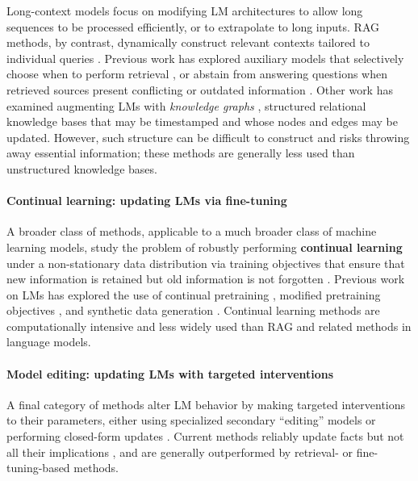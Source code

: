 \documentclass[11pt]{article}
\begin{document}
Long-context models \citep{wang2020linformer,kitaev2020reformer,press2021train,su2024roformer} focus on modifying LM architectures to allow long sequences to be processed efficiently, or to extrapolate to long inputs.
RAG methods, by contrast, dynamically 
construct relevant contexts tailored to individual queries \citep{guu2020,lewis2020}.
Previous work has explored auxiliary models that selectively choose when to perform retrieval \citep{mitchell2022memory}, or abstain from answering questions when retrieved sources present conflicting or outdated information \citep{chen-etal-2022-rich,zhang-choi-2023-mitigating}.
Other work has examined augmenting LMs with \textit{knowledge graphs} \citep{ijcai2023p0734,modarressi2024memllm}, structured relational knowledge bases that may be timestamped and whose nodes and edges may be updated.
However, such structure can be difficult to construct and risks throwing away essential information; these methods are generally less used than unstructured knowledge bases.

\paragraph{Continual learning: updating LMs via fine-tuning} A broader class of methods, applicable to a much broader class of machine learning models, study the problem of robustly performing \textbf{continual learning} under a non-stationary data distribution \cite{nell, wang2024comprehensive} via training objectives that ensure that new information is retained but old information is not forgotten \cite{jang2022continual,mehta2023dsi, jang2023temporalwiki}. Previous work on LMs has explored the use of continual pretraining \citep{jin-etal-2022-lifelong}, modified pretraining objectives \citep{xu-etal-2023-kilm}, and synthetic data generation \citep{padmanabhan_2023_distill,akyurek2024deductive}.
Continual learning methods are computationally intensive and less widely used than RAG and related methods in language models.

\paragraph{Model editing: updating LMs with targeted interventions} A final category of methods alter LM behavior by making targeted interventions to their parameters, either using specialized secondary ``editing'' models \citep{decao2021editing, mitchell2022fast}
or performing closed-form updates
\citep{meng2022locating, meng2023massediting}. Current methods reliably 
update facts but not all their implications \cite{onoe-etal-2023-lms,hua2024propagation}, and are generally outperformed by retrieval- or fine-tuning-based methods.
 
\end{document}
